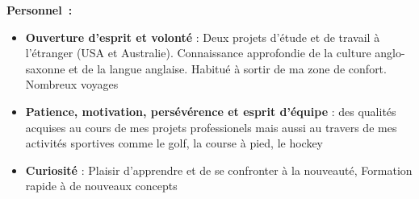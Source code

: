 \documentclass[]{friggeri-cv} %
\begin{document}
\textbf{\large Personnel~:} 
\begin{itemize}[noitemsep,nolistsep]
\item \textbf{Ouverture d'esprit et volonté} : Deux projets d'étude et de travail à l'étranger (USA et Australie). Connaissance approfondie de la culture anglo-saxonne et de la langue anglaise. Habitué à sortir de ma zone de confort. Nombreux voyages
\item \textbf{Patience, motivation, persévérence et esprit d'équipe} : des qualités acquises au cours de mes projets professionels mais aussi au travers de mes activités sportives comme le golf, la course à pied, le hockey
\item \textbf{Curiosité} : Plaisir d'apprendre et de se confronter à la nouveauté, Formation rapide à de nouveaux concepts
\end{itemize}






\end{document}
